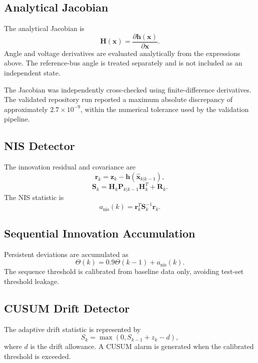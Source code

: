 \documentclass[journal]{IEEEtran}
\begin{document}
\subsection{Analytical Jacobian}
The analytical Jacobian is
\begin{equation}
\mathbf{H}(\mathbf{x})=\frac{\partial\mathbf{h}(\mathbf{x})}{\partial\mathbf{x}}.
\end{equation}
Angle and voltage derivatives are evaluated analytically from the expressions above. The reference-bus angle is treated separately and is not included as an independent state.

The Jacobian was independently cross-checked using finite-difference derivatives. The validated repository run reported a maximum absolute discrepancy of approximately $2.7\times10^{-9}$, within the numerical tolerance used by the validation pipeline.

\subsection{NIS Detector}
The innovation residual and covariance are
\begin{equation}
\mathbf{r}_k=\mathbf{z}_k-\mathbf{h}(\hat{\mathbf{x}}_{k|k-1}),
\end{equation}
\begin{equation}
\mathbf{S}_k=\mathbf{H}_k\mathbf{P}_{k|k-1}\mathbf{H}_k^T+\mathbf{R}_k.
\end{equation}
The NIS statistic is
\begin{equation}
a_{\mathrm{nis}}(k)=\mathbf{r}_k^T\mathbf{S}_k^{-1}\mathbf{r}_k.
\end{equation}

\subsection{Sequential Innovation Accumulation}
Persistent deviations are accumulated as
\begin{equation}
\Theta(k)=0.9\Theta(k-1)+a_{\mathrm{nis}}(k).
\end{equation}
The sequence threshold is calibrated from baseline data only, avoiding test-set threshold leakage.

\subsection{CUSUM Drift Detector}
The adaptive drift statistic is represented by
\begin{equation}
S_k=\max\left(0,S_{k-1}+z_k-d\right),
\end{equation}
where $d$ is the drift allowance. A CUSUM alarm is generated when the calibrated threshold is exceeded.
\end{document}
